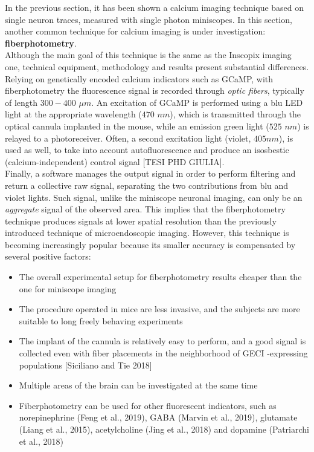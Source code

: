 \documentclass[12pt, a4paper]{article}
\begin{document}
In the previous section, it has been shown a calcium imaging technique based on single neuron traces, measured with single photon miniscopes. In this section, another common technique for calcium imaging is under investigation: \textbf{fiberphotometry}. \\
Although the main goal of this technique is the same as the Inscopix imaging one, technical equipment, methodology and results present substantial differences.\\
Relying on genetically encoded calcium indicators such as GCaMP, with fiberphotometry the fluorescence signal is recorded through \textit{optic fibers}, typically of length $300-400$ $ \mu m$. An excitation of GCaMP is performed using a blu LED light at the appropriate wavelength ($470$ $ nm$), which is transmitted through the optical cannula implanted in the mouse, while an emission green light ($525$ $ nm$) is relayed to a photoreceiver. Often, a second excitation light (violet, $405 nm$), is used as well, to take into account autofluorescence and produce an isosbestic (calcium-independent) control signal [TESI PHD GIULIA].\\
 Finally, a software manages the output signal in order to perform filtering and return a collective raw signal, separating the two contributions from blu and violet lights. Such signal, unlike the miniscope neuronal imaging, can only be an \textit{aggregate} signal of the observed area. This implies that the fiberphotometry technique produces signals at lower spatial resolution than the previously introduced technique of microendoscopic imaging. However, this technique is becoming increasingly popular because its smaller accuracy is compensated by several positive factors:

\begin{itemize}
	
	\item The overall experimental setup for fiberphotometry results cheaper than the one for miniscope imaging 
	
	\item The procedure operated in mice are less invasive, and the subjects are more suitable to long freely behaving experiments
	
	\item The implant of the cannula is relatively easy to perform, and a good signal is collected even with fiber placements in the neighborhood of GECI -expressing populations [Siciliano and Tie 2018]
	
	\item Multiple areas of the brain can be investigated at the same time 
	
	\item Fiberphotometry can be used for other fluorescent indicators, such as norepinephrine (Feng et al., 2019), GABA (Marvin et al., 2019), glutamate (Liang et al., 2015),
	acetylcholine (Jing et al., 2018) and dopamine (Patriarchi et al., 2018)
	
	
	
\end{itemize}
\end{document}
